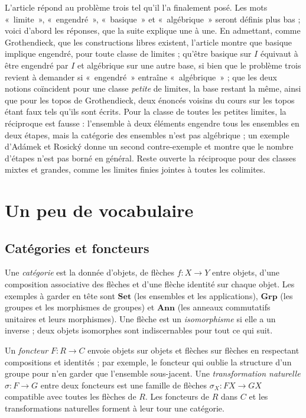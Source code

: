 \documentclass[11pt,a4paper]{amsart}
\theoremstyle{definition}
\theoremstyle{plain}
\theoremstyle{remark}
\newcommand{\Set}{\mathbf{Set}}
\newcommand{\Grp}{\mathbf{Grp}}
\newcommand{\Ann}{\mathbf{Ann}}
\begin{document}
L'article répond au problème trois tel qu'il l'a finalement posé. Les mots «~limite~», «~engendré~», «~basique~» et «~algébrique~» seront définis plus bas ; voici d'abord les réponses, que la suite explique une à une. En admettant, comme Grothendieck, que les constructions libres existent, l'article montre que basique implique engendré, pour toute classe de limites ; qu'être basique sur $I$ équivaut à être engendré par $I$ et algébrique sur une autre base, si bien que le problème trois revient à demander si «~engendré~» entraîne «~algébrique~» ; que les deux notions coïncident pour une classe \emph{petite} de limites, la base restant la même, ainsi que pour les topos de Grothendieck, deux énoncés voisins du cours sur les topos étant faux tels qu'ils sont écrits. Pour la classe de toutes les petites limites, la réciproque est fausse : l'ensemble à deux éléments engendre tous les ensembles en deux étapes, mais la catégorie des ensembles n'est pas algébrique ; un exemple d'Adámek et Rosický donne un second contre-exemple et montre que le nombre d'étapes n'est pas borné en général. Reste ouverte la réciproque pour des classes mixtes et grandes, comme les limites finies jointes à toutes les colimites.

\section{Un peu de vocabulaire}

\subsection{Catégories et foncteurs}

Une \emph{catégorie} est la donnée d'objets, de flèches $f\colon X\to Y$ entre objets, d'une composition associative des flèches et d'une flèche identité sur chaque objet. Les exemples à garder en tête sont $\Set$ (les ensembles et les applications), $\Grp$ (les groupes et les morphismes de groupes) et $\Ann$ (les anneaux commutatifs unitaires et leurs morphismes). Une flèche est un \emph{isomorphisme} si elle a un inverse ; deux objets isomorphes sont indiscernables pour tout ce qui suit.

Un \emph{foncteur} $F\colon R\to C$ envoie objets sur objets et flèches sur flèches en respectant compositions et identités ; par exemple, le foncteur qui oublie la structure d'un groupe pour n'en garder que l'ensemble sous-jacent. Une \emph{transformation naturelle} $\sigma\colon F\to G$ entre deux foncteurs est une famille de flèches $\sigma_X\colon FX\to GX$ compatible avec toutes les flèches de $R$. Les foncteurs de $R$ dans $C$ et les transformations naturelles forment à leur tour une catégorie.
\end{document}
